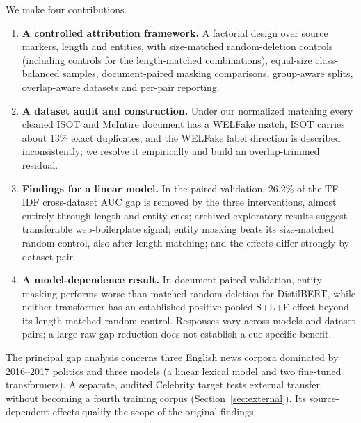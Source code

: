 We make four contributions.
\begin{enumerate}
\item \textbf{A controlled attribution framework.} A factorial design over source markers, length and entities, with size-matched random-deletion controls (including controls for the length-matched combinations), equal-size class-balanced samples, document-paired masking comparisons, group-aware splits, overlap-aware datasets and per-pair reporting.
\item \textbf{A dataset audit and construction.} Under our normalized matching every cleaned ISOT and McIntire document has a WELFake match, ISOT carries about 13\% exact duplicates, and the WELFake label direction is described inconsistently; we resolve it empirically and build an overlap-trimmed residual.
\item \textbf{Findings for a linear model.} In the paired validation, 26.2\% of the TF-IDF cross-dataset AUC gap is removed by the three interventions, almost entirely through length and entity cues; archived exploratory results suggest transferable web-boilerplate signal; entity masking beats its size-matched random control, also after length matching; and the effects differ strongly by dataset pair.
\item \textbf{A model-dependence result.} In document-paired validation, entity masking performs worse than matched random deletion for DistilBERT, while neither transformer has an established positive pooled S+L+E effect beyond its length-matched random control. Responses vary across models and dataset pairs; a large raw gap reduction does not establish a cue-specific benefit.
\end{enumerate}
The principal gap analysis concerns three English news corpora dominated by 2016--2017 politics and three models (a linear lexical model and two fine-tuned transformers). A separate, audited Celebrity target tests external transfer without becoming a fourth training corpus (Section~\ref{sec:external}). Its source-dependent effects qualify the scope of the original findings.


